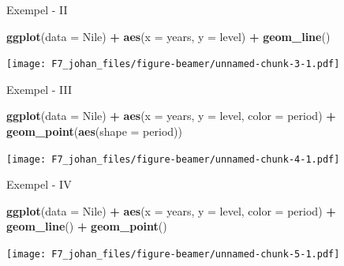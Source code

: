 \documentclass[
  11pt,
  ignorenonframetext,
  handout]{beamer}
\newenvironment{Shaded}{\begin{snugshade}}{\end{snugshade}}
\newcommand{\AttributeTok}[1]{\textcolor[rgb]{0.13,0.29,0.53}{#1}}
\newcommand{\FunctionTok}[1]{\textcolor[rgb]{0.13,0.29,0.53}{\textbf{#1}}}
\newcommand{\NormalTok}[1]{#1}
\newcommand{\SpecialCharTok}[1]{\textcolor[rgb]{0.81,0.36,0.00}{\textbf{#1}}}
\begin{document}
\begin{frame}[fragile]{Exempel - II}
\label{exempel---ii}
\begin{Shaded}
\begin{Highlighting}[]
\FunctionTok{ggplot}\NormalTok{(}\AttributeTok{data =}\NormalTok{ Nile) }\SpecialCharTok{+} 
  \FunctionTok{aes}\NormalTok{(}\AttributeTok{x =}\NormalTok{ years, }\AttributeTok{y =}\NormalTok{ level) }\SpecialCharTok{+} 
  \FunctionTok{geom\_line}\NormalTok{()}
\end{Highlighting}
\end{Shaded}

\texttt{[image: F7\_johan\_files/figure-beamer/unnamed-chunk-3-1.pdf]}
\end{frame}

\begin{frame}[fragile]{Exempel - III}
\label{exempel---iii}
\begin{Shaded}
\begin{Highlighting}[]
\FunctionTok{ggplot}\NormalTok{(}\AttributeTok{data =}\NormalTok{ Nile) }\SpecialCharTok{+} 
  \FunctionTok{aes}\NormalTok{(}\AttributeTok{x =}\NormalTok{ years, }\AttributeTok{y =}\NormalTok{ level, }\AttributeTok{color =}\NormalTok{ period) }\SpecialCharTok{+} 
  \FunctionTok{geom\_point}\NormalTok{(}\FunctionTok{aes}\NormalTok{(}\AttributeTok{shape =}\NormalTok{ period))}
\end{Highlighting}
\end{Shaded}

\texttt{[image: F7\_johan\_files/figure-beamer/unnamed-chunk-4-1.pdf]}
\end{frame}

\begin{frame}[fragile]{Exempel - IV}
\label{exempel---iv}
\begin{Shaded}
\begin{Highlighting}[]
\FunctionTok{ggplot}\NormalTok{(}\AttributeTok{data =}\NormalTok{ Nile) }\SpecialCharTok{+} 
  \FunctionTok{aes}\NormalTok{(}\AttributeTok{x =}\NormalTok{ years, }\AttributeTok{y =}\NormalTok{ level, }\AttributeTok{color =}\NormalTok{ period) }\SpecialCharTok{+} 
  \FunctionTok{geom\_line}\NormalTok{() }\SpecialCharTok{+}
  \FunctionTok{geom\_point}\NormalTok{()}
\end{Highlighting}
\end{Shaded}

\texttt{[image: F7\_johan\_files/figure-beamer/unnamed-chunk-5-1.pdf]}
\end{frame}
\end{document}
